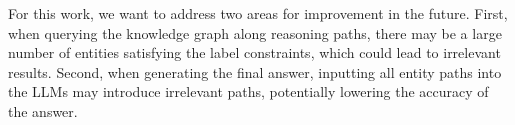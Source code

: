For this work, we want to address two areas for improvement in the future. First, when querying the knowledge graph along reasoning paths, there may be a large number of entities satisfying the label constraints, which could lead to irrelevant results. Second, when generating the final answer, inputting all entity paths into the LLMs may introduce irrelevant paths, potentially lowering the accuracy of the answer.